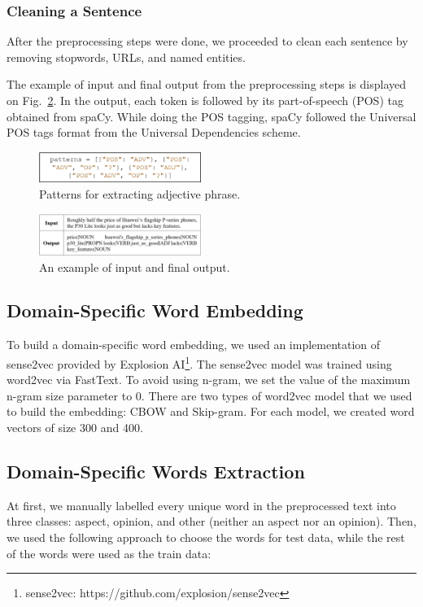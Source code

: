 \documentclass[a4paper,conference]{IEEEtran}
\begin{document}
\subsubsection{Cleaning a Sentence}
After the preprocessing steps were done, we proceeded to clean each sentence by removing stopwords, URLs, and named entities.

The example of input and final output from the preprocessing steps is displayed on Fig.~\ref{fig5}. In the output, each token is followed by its part-of-speech (POS) tag obtained from spaCy. While doing the POS tagging, spaCy followed the Universal POS tags format from the Universal Dependencies scheme.

\begin{figure}[htbp]
\centerline{\includegraphics[width=0.47\textwidth]{fig4.jpg}}
\caption{Patterns for extracting adjective phrase.}
\label{fig4}
\end{figure}

\begin{figure}[htbp]
\centerline{\includegraphics[width=0.47\textwidth]{fig5.jpg}}
\caption{An example of input and final output.}
\label{fig5}
\end{figure}

\subsection{Domain-Specific Word Embedding}
To build a domain-specific word embedding, we used an implementation of sense2vec provided by Explosion AI\footnote{sense2vec: https://github.com/explosion/sense2vec}. The sense2vec model was trained using word2vec via FastText. To avoid using n-gram, we set the value of the maximum n-gram size parameter to 0. There are two types of word2vec model that we used to build the embedding: CBOW and Skip-gram. For each model, we created word vectors of size 300 and 400.

\subsection{Domain-Specific Words Extraction}
At first, we manually labelled every unique word in the preprocessed text into three classes: aspect, opinion, and other (neither an aspect nor an opinion). Then, we used the following approach to choose the words for test data, while the rest of the words were used as the train data:
\end{document}
